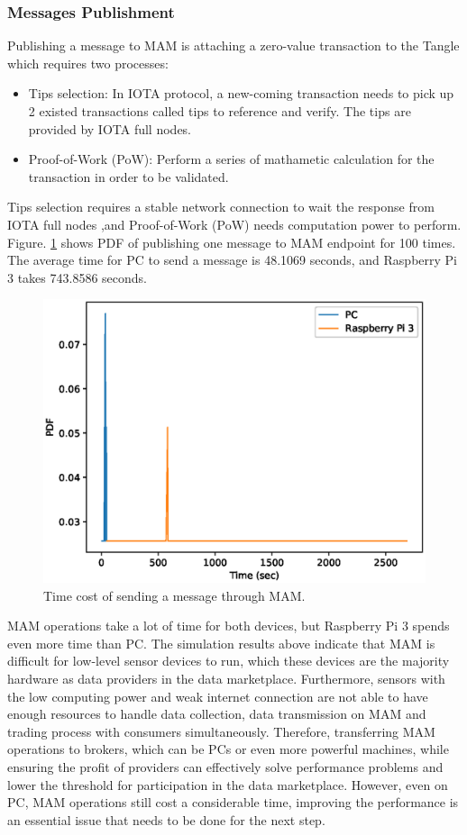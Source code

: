 \documentclass[journal,article,applsci,submit,moreauthors,pdftex]{Definitions/mdpi}
\begin{document}
\subsubsection{Messages Publishment}
Publishing a message to MAM is attaching a zero-value transaction to the Tangle which requires two processes:
\begin{itemize}[leftmargin=*,labelsep=5.8mm]
	\item	Tips selection: In IOTA protocol, a new-coming transaction needs to pick up 2 existed transactions called tips to reference and verify. The tips are provided by IOTA full nodes.
	\item	Proof-of-Work (PoW): Perform a series of mathametic calculation for the transaction in order to be validated.
\end{itemize}

Tips selection requires a stable network connection to wait the response from IOTA full nodes ,and Proof-of-Work (PoW) needs computation power to perform. Figure. \ref{fig:mam_send} shows PDF of publishing one message to MAM endpoint for 100 times. The average time for PC to send a message is 48.1069 seconds, and Raspberry Pi 3 takes 743.8586 seconds.

\begin{figure}[H]
    \centering
    \includegraphics[width=3.3 in]{mam_send}
    \caption{Time cost of sending a message through MAM.}
    \label{fig:mam_send}
\end{figure}

MAM operations take a lot of time for both devices, but Raspberry Pi 3 spends even more time than PC. The simulation results above indicate that MAM is difficult for low-level sensor devices to run, which these devices are the majority hardware as data providers in the data marketplace. Furthermore, sensors with the low computing power and weak internet connection are not able to have enough resources to handle data collection, data transmission on MAM and trading process with consumers simultaneously. Therefore, transferring MAM operations to brokers, which can be PCs or even more powerful machines, while ensuring the profit of providers can effectively solve performance problems and lower the threshold for participation in the data marketplace. However, even on PC, MAM operations still cost a considerable time, improving the performance is an essential issue that needs to be done for the next step.  
\end{document}
